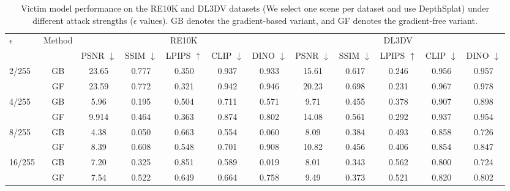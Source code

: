 \begin{table}[h]
\centering
\caption{Victim model performance on the RE10K and DL3DV datasets (We select one scene per dataset and use DepthSplat) under different attack strengths ($\epsilon$ values). GB denotes the gradient-based variant, and GF denotes the gradient-free variant.}
\label{tab:attack_strenths}
{\fontsize{6pt}{7pt}\selectfont
\begin{tabular}{lc ccccc @{\hspace{1em}} ccccc}
\toprule
\multirow{2}{*}{$\epsilon$} & \multirow{2}{*}{Method} & \multicolumn{5}{c}{RE10K} & \multicolumn{5}{c}{DL3DV} \\
\cmidrule(lr){3-7} \cmidrule(l){8-12}
& & \cellcolor{gray!20}PSNR $\downarrow$ & \cellcolor{gray!20}SSIM $\downarrow$ & \cellcolor{gray!20}LPIPS $\uparrow$ & \cellcolor{gray!20}CLIP $\downarrow$ & \cellcolor{gray!20}DINO $\downarrow$ 
& \cellcolor{gray!20}PSNR $\downarrow$ & \cellcolor{gray!20}SSIM $\downarrow$ & \cellcolor{gray!20}LPIPS $\uparrow$ & \cellcolor{gray!20}CLIP $\downarrow$ & \cellcolor{gray!20}DINO $\downarrow$ \\
\midrule
\multirow{2}{*}{2/255} 
& GB & 23.65 & 0.777 & 0.350 & 0.937 & 0.933 & 15.61 & 0.617 & 0.246 & 0.956 & 0.957 \\
& GF & 23.59 & 0.772 & 0.321 & 0.942 & 0.946 & 20.23 & 0.698 & 0.231 & 0.967 & 0.978 \\
\midrule
\multirow{2}{*}{4/255} 
& GB & 5.96  & 0.195 & 0.504 & 0.711 & 0.571 & 9.71  & 0.455 & 0.378 & 0.907 & 0.898 \\
& GF & 9.914 & 0.464 & 0.363 & 0.874 & 0.802 & 14.08 & 0.561 & 0.292 & 0.937 & 0.954 \\
\midrule
\multirow{2}{*}{8/255} 
& GB & 4.38  & 0.050 & 0.663 & 0.554 & 0.060 & 8.09  & 0.384 & 0.493 & 0.858 & 0.726 \\
& GF & 8.39  & 0.608 & 0.548 & 0.701 & 0.908 & 10.82 & 0.456 & 0.406 & 0.854 & 0.847 \\
\midrule
\multirow{2}{*}{16/255} 
& GB & 7.20  & 0.325 & 0.851 & 0.589 & 0.019 & 8.01  & 0.343 & 0.562 & 0.800 & 0.724 \\
& GF & 7.54  & 0.522 & 0.649 & 0.664 & 0.758 & 9.49  & 0.373 & 0.521 & 0.820 & 0.802 \\
\bottomrule
\end{tabular}%
}
\end{table}